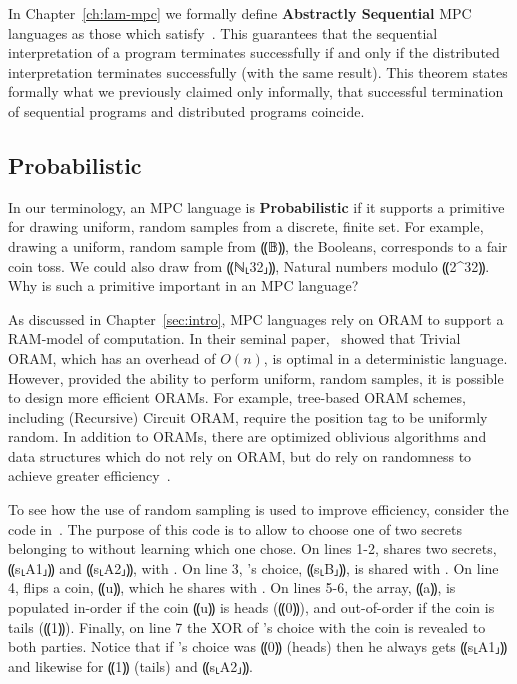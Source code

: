 In Chapter~\ref{ch:lam-mpc} we formally define \textbf{Abstractly Sequential} MPC languages as those which satisfy~.
This guarantees that the sequential interpretation of a program terminates successfully if and only if the distributed interpretation terminates successfully (with the same
result). This theorem states formally what we previously claimed only informally, that successful termination of sequential programs and distributed programs coincide.

\subsection{Probabilistic}
\label{subsec:background-properties-probabilistic}

In our terminology, an MPC language is \textbf{Probabilistic} if it supports a primitive for drawing uniform, random samples from a
discrete, finite set. For example, drawing a uniform, random sample from ⸨𝔹⸩, the Booleans, corresponds to a fair coin toss. We
could also draw from ⸨ℕ⸤32⸥⸩, Natural numbers modulo ⸨2^{32}⸩. Why is such a primitive important in an MPC language?

As discussed in Chapter~\ref{sec:intro}, MPC languages rely on ORAM to support a RAM-model of computation. In their seminal paper,~\citet{}
showed that Trivial ORAM, which has an overhead of $O(n)$, is optimal in a deterministic language. However, provided the ability
to perform uniform, random samples, it is possible to design more efficient ORAMs. For example, tree-based ORAM schemes, including
(Recursive) Circuit ORAM, require the position tag to be uniformly random. In addition to ORAMs, there are optimized oblivious algorithms
and data structures which do not rely on ORAM, but do rely on randomness to achieve greater efficiency~\cite{}.

To see how the use of random sampling is used to improve efficiency, consider the \mpc{} code in~. The purpose of
this code is to allow \bob to choose one of two secrets belonging to \alice without \alice learning which one \bob chose. On lines 1-2,
\alice shares two secrets, ⸨s⸤A1⸥⸩ and ⸨s⸤A2⸥⸩, with \bob. On line 3, \bob's choice, ⸨s⸤B⸥⸩, is shared with \alice.
On line 4, \bob flips a coin, ⸨u⸩, which he shares with \alice. On lines 5-6, the array, ⸨a⸩, is populated
in-order if the coin ⸨u⸩ is heads (⸨0⸩), and out-of-order if the coin is tails (⸨1⸩). Finally, on line 7 the XOR of \bob's choice with the
coin is revealed to both parties. Notice that if \bob's choice was ⸨0⸩ (heads) then he always gets ⸨s⸤A1⸥⸩ and
likewise for ⸨1⸩ (tails) and ⸨s⸤A2⸥⸩.


